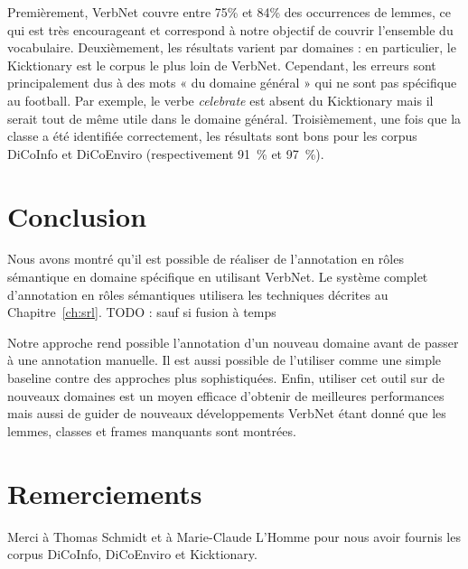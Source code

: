 Premièrement, VerbNet couvre entre 75\% et 84\% des occurrences de lemmes, ce
qui est très encourageant et correspond à notre objectif de couvrir l'ensemble
du vocabulaire.
Deuxièmement, les résultats varient par domaines : en particulier, le
Kicktionary est le corpus le plus loin de VerbNet. Cependant, les erreurs sont
principalement dus à des mots « du domaine général » qui ne sont pas spécifique
au football. Par exemple, le verbe \textit{celebrate} est absent du Kicktionary
mais il serait tout de même utile dans le domaine général.
Troisièmement, une fois que la classe a été identifiée correctement, les
résultats sont bons pour les corpus DiCoInfo et DiCoEnviro (respectivement
91~\% et 97~\%).

\section*{Conclusion}

Nous avons montré qu'il est possible de réaliser de l'annotation en rôles
sémantique en domaine spécifique en utilisant VerbNet. Le système complet
d'annotation en rôles sémantiques utilisera les techniques décrites au
Chapitre~\ref{ch:srl}. TODO : sauf si fusion à temps

Notre approche rend possible l'annotation d'un nouveau domaine avant de passer
à une annotation manuelle. Il est aussi possible de l'utiliser comme une simple
baseline contre des approches plus sophistiquées. Enfin, utiliser cet outil sur
de nouveaux domaines est un moyen efficace d'obtenir de meilleures performances
mais aussi de guider de nouveaux développements VerbNet étant donné que les
lemmes, classes et frames manquants sont montrées.

\section*{Remerciements}

Merci à Thomas Schmidt et à Marie-Claude L'Homme pour nous avoir fournis les
corpus DiCoInfo, DiCoEnviro et Kicktionary.

